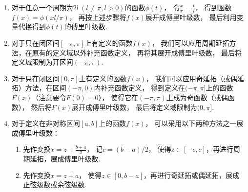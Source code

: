 \begin{enumerate}
	\item 对于任意一个周期为\(2l\ (l\neq\pi,l>0)\)的函数\(\phi(t)\)，
	令\(\frac{x}{\pi} = \frac{t}{l}\)，
	得到函数\(f(x) = \phi(xl/\pi)\)，
	再按上述步骤将\(f(x)\)展开成傅里叶级数，
	最后利用变量代换得到\(\phi(t)\)的傅里叶级数.

	\item 对于只在闭区间\([-\pi,\pi]\)上有定义的函数\(f(x)\)，
	我们可以应用周期延拓方法，在原有的定义域以外补充函数定义，
	再将其展开成傅里叶级数，
	最后将定义域限制为开区间\((-\pi,\pi)\).

	\item 对于只在闭区间\([0,\pi]\)上有定义的函数\(f(x)\)，
	我们可以应用奇延拓（或偶延拓）方法，在区间\((-\pi,0)\)内补充函数定义，
	得到定义在\((-\pi,\pi]\)上的函数\(F(x)\)（注意要令\(F(0) = 0\)），
	使得它在\((-\pi,\pi)\)上成为奇函数（或偶函数），
	然后将\(F(x)\)展开成傅里叶级数，
	最后将定义域限制为\((0,\pi]\).

	\item 对于定义在非对称区间\([a,b]\)上的函数\(f(x)\)，
	可以采用以下两种方法之一展成傅里叶级数：
		\begin{enumerate}
			\item 先作变换\(x = z + \frac{b+a}{2}\)，
			记\(c = (b-a)/2\)，
			使得\(z\in[-c,c]\)，再进行周期延拓，展成傅里叶级数.
			\item 先作变换\(x = z + a\)，
			使得\(z\in[0,b-a]\)，再进行奇延拓或偶延拓，展成正弦级数或余弦级数.
		\end{enumerate}
\end{enumerate}
